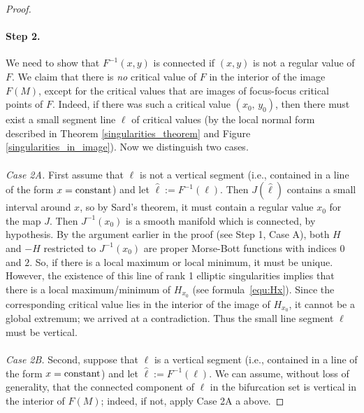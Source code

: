 \documentclass[11pt]{article}
\begin{document}
\begin{proof}
  \paragraph{Step 2.} We need to show that $F ^{-1}(x,y)$ is
  connected if $(x,y)$ is not a regular value of $F$.  We claim that
  there is \emph{no} critical value of $F$ in the interior of the
  image $F(M)$, except for the critical values that are images of
  focus-focus critical points of $F$. Indeed, if there was such a
  critical value $(x_0,\,y_0)$, then there must exist a small segment
  line $\ell$ of critical values (by the local normal form described
  in Theorem \ref{singularities_theorem} and Figure
  \ref{singularities_in_image}). Now we distinguish two cases.
\\
\\
  \emph{Case 2A.} First assume that $\ell$ is not a vertical
  segment (i.e., contained in a line of the form
  $x=\textup{constant}$) and let $\hat{\ell}:=F^{-1}(\ell)$.  Then
  $J(\hat{\ell})$ contains a small interval around $x$, so by Sard's
  theorem, it must contain a regular value $x_0$ for the map $J$. Then
  $J^{-1}(x_0)$ is a smooth manifold which is connected, by
  hypothesis. By the argument earlier in the proof (see Step 1, Case
  A), both $H$ and $-H$ restricted to $J^{-1}(x_0)$ are proper
  Morse-Bott functions with indices $0$ and $2$. So, if there is a
  local maximum or local minimum, it must be unique. However, the
  existence of this line of rank 1 elliptic singularities implies that
  there is a local maximum/minimum of $H_{x_0}$ (see
  formula~\eqref{equ:Hx}).  Since the corresponding critical value
  lies in the interior of the image of $H_{x_0}$, it cannot be a
  global extremum; we arrived at a contradiction. Thus the small line
  segment $\ell$ must be vertical.
  \\
  \\
  \emph{Case 2B.} Second, suppose that $\ell$ is a vertical
  segment (i.e., contained in a line of the form
  $x=\textup{constant}$) and let $\hat{\ell}:=F^{-1}(\ell)$.  We can
  assume, without loss of generality, that the connected component of
  $\ell$ in the bifurcation set is vertical in the interior of $F(M)$;
  indeed, if not, apply Case 2A a above.
  

\end{proof}
\end{document}
